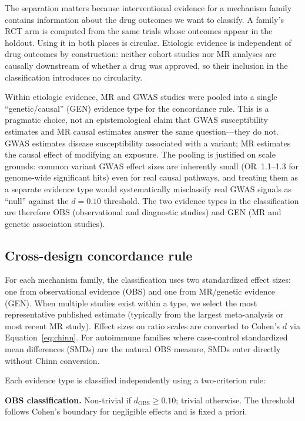 \documentclass[11pt]{article}
\begin{document}
The separation matters because interventional evidence for a mechanism family contains information about the drug outcomes we want to classify. A family's RCT arm is computed from the same trials whose outcomes appear in the holdout. Using it in both places is circular. Etiologic evidence is independent of drug outcomes by construction: neither cohort studies nor MR analyses are causally downstream of whether a drug was approved, so their inclusion in the classification introduces no circularity.

Within etiologic evidence, MR and GWAS studies were pooled into a single ``genetic/causal'' (GEN) evidence type for the concordance rule. This is a pragmatic choice, not an epistemological claim that GWAS susceptibility estimates and MR causal estimates answer the same question---they do not. GWAS estimates disease susceptibility associated with a variant; MR estimates the causal effect of modifying an exposure. The pooling is justified on scale grounds: common variant GWAS effect sizes are inherently small (OR~1.1--1.3 for genome-wide significant hits) even for real causal pathways, and treating them as a separate evidence type would systematically misclassify real GWAS signals as ``null'' against the $d = 0.10$ threshold. The two evidence types in the classification are therefore OBS (observational and diagnostic studies) and GEN (MR and genetic association studies).

\subsection{Cross-design concordance rule}

For each mechanism family, the classification uses two standardized effect sizes: one from observational evidence (OBS) and one from MR/genetic evidence (GEN). When multiple studies exist within a type, we select the most representative published estimate (typically from the largest meta-analysis or most recent MR study). Effect sizes on ratio scales are converted to Cohen's $d$ via Equation~\ref{eq:chinn}. For autoimmune families where case-control standardized mean differences (SMDs) are the natural OBS measure, SMDs enter directly without Chinn conversion.

Each evidence type is classified independently using a two-criterion rule:

\textbf{OBS classification.} Non-trivial if $d_{\text{OBS}} \geq 0.10$; trivial otherwise. The threshold follows Cohen's boundary for negligible effects and is fixed a priori.
\end{document}
